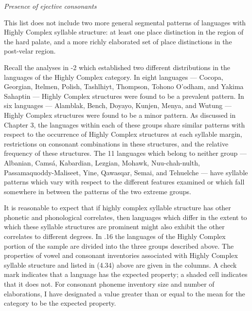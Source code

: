\textit{Presence} \textit{of} \textit{ejective} \textit{consonants}

\z


  This list does not include two more general segmental patterns of languages with Highly Complex syllable structure: at least one place distinction in the region of the hard palate, and a more richly elaborated set of place distinctions in the post-velar region.



  Recall the analyses in -2 which established two different distributions in the languages of the Highly Complex category. In eight languages — Cocopa, Georgian, Itelmen, Polish, Tashlhiyt, Thompson, Tohono O’odham, and Yakima Sahaptin — Highly Complex structures were found to be a prevalent pattern. In six languages — Alamblak, Bench, Doyayo, Kunjen, Menya, and Wutung — Highly Complex structures were found to be a minor pattern. As discussed in Chapter 3, the languages within each of these groups share similar patterns with respect to the occurrence of Highly Complex structures at each syllable margin, restrictions on consonant combinations in these structures, and the relative frequency of these structures. The 11 languages which belong to neither group — Albanian, Camsá, Kabardian, Lezgian, Mohawk, Nuu-chah-nulth, Passamaquoddy-Maliseet, Yine, Qawasqar, Semai, and Tehuelche — have syllable patterns which vary with respect to the different features examined or which fall somewhere in between the patterns of the two extreme groups.



  It is reasonable to expect that if highly complex syllable structure has other phonetic and phonological correlates, then languages which differ in the extent to which these syllable structures are prominent might also exhibit the other correlates to different degrees. In .16 the languages of the Highly Complex portion of the sample are divided into the three groups described above. The properties of vowel and consonant inventories associated with Highly Complex syllable structure and listed in (4.34) above are given in the columns. A check mark indicates that a language has the expected property; a shaded cell indicates that it does not. For consonant phoneme inventory size and number of elaborations, I have designated a value greater than or equal to the mean for the category to be the expected property.







